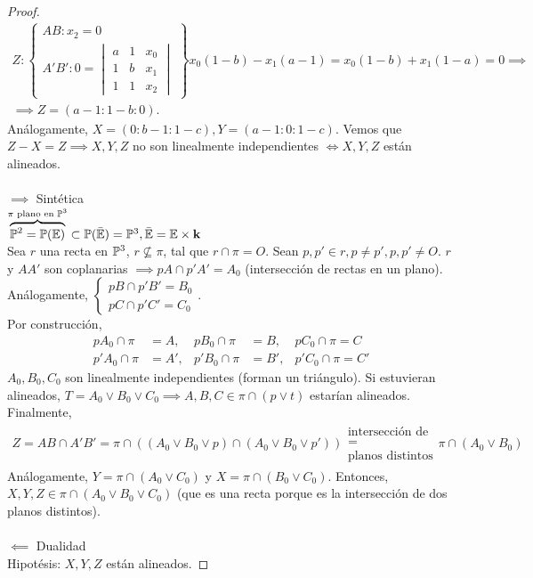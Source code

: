 \begin{proof}
\begin{gather*}
Z : \left. \begin{cases}
AB : x_2 = 0 \\
A'B' : 0 = \begin{vmatrix} a & 1 & x_0 \\ 1 & b & x_1 \\ 1 & 1 & x_2 \end{vmatrix}
\end{cases} \right\}
x_0(1-b)-x_1(a-1)=x_0(1-b) + x_1(1-a) = 0 \implies \\ \implies Z = (a-1:1-b:0).
\end{gather*}
Análogamente, $X = (0:b-1:1-c), Y = (a-1:0:1-c)$. Vemos que $Z-X = Z \implies X,Y,Z$ no son linealmente independientes $\iff X,Y,Z$
están alineados. \\ \\
$\implies$ Sintética \\
$\overbrace{\mathbb{P}^2 = \mathbb{P}(\mathbb{E})}^{\pi \text{ plano en } \mathbb{P}^3} \subset \mathbb{P}(\bar{\mathbb{E}}) = \mathbb{P}^3, \bar{\mathbb{E}} = \mathbb{E} \times \mathbf{k}$ \\
Sea $r$ una recta en $\mathbb{P}^3$, $r \nsubseteq \pi$, tal que $r \cap \pi = O$. Sean $p,p' \in r, p\neq p', p, p' \neq O$.
$r$ y $AA'$ son coplanarias $\implies pA \cap p'A' = A_0$ (intersección de rectas en un plano). Análogamente,
$\begin{cases} pB \cap p'B' = B_0 \\ pC \cap p'C' = C_0 \end{cases}$. \\
Por construcción,
\begin{align*}
    pA_0 \cap \pi &= A, & pB_0 \cap \pi &= B, & pC_0 \cap \pi = C \\
    p'A_0 \cap \pi &= A', & p'B_0 \cap \pi &= B', & p'C_0 \cap \pi = C'
\end{align*}
$A_0, B_0, C_0$ son linealmente independientes (forman un triángulo). Si estuvieran alineados, $T = A_0 \vee B_0 \vee C_0 \implies A,B,C \in
\pi \cap (p \vee t)$ estarían alineados.\\
Finalmente,
\begin{gather*}
    Z = AB \cap A'B'= \pi \cap \left( \left( A_0 \vee B_0 \vee p \right) \cap \left( A_0 \vee B_0 \vee p' \right) \right)
    \substack{\text{intersección de} \\ = \\ \text{planos distintos}} \pi \cap \left( A_0 \vee B_0 \right)
\end{gather*}
Análogamente, $Y = \pi \cap \left( A_0 \vee C_0 \right)$ y $X = \pi \cap \left( B_0 \vee C_0 \right)$. Entonces, $X,Y,Z \in \pi\cap\left(
A_0 \vee B_0 \vee C_0 \right)$ (que es una recta porque es la intersección de dos planos distintos).
\\ \\
$\impliedby$ Dualidad \\
Hipotésis: $X, Y, Z$ están alineados.


\end{proof}
